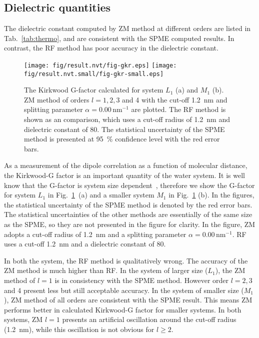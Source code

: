 \documentclass[aip,jcp,a4paper,preprint,unsortedaddress,onecolumn,fleqn]{revtex4-1}
\newcommand{\systemmb}{M_1}
\newcommand{\systemlb}{L_1}
\begin{document}
\subsection{Dielectric quantities}

The dielectric constant computed by ZM method at different orders are listed in Tab.~\ref{tab:thermo},
and are consistent with the SPME computed results. In contrast, the RF method has poor accuracy in
the dielectric constant.

\begin{figure}
  \centering
  \texttt{[image: fig/result.nvt/fig-gkr.eps]}
  \texttt{[image: fig/result.nvt.small/fig-gkr-small.eps]}
  \caption{The Kirkwood G-factor calculated for system $\systemlb$ (a) and $\systemmb$ (b).
    ZM method of orders $l=1,2,3$ and 4 with the cut-off 1.2~nm and splitting parameter $\alpha = 0.00\,\textrm{nm}^{-1}$ are plotted.
    The RF method is shown as an comparison, which uses a cut-off radius of 1.2~nm and dielectric constant of 80.
    The statistical uncertainty of the SPME method is presented at 95~\% confidence level with the red error bars.
  }
  \label{fig:gkr}
\end{figure}

As a measurement of the dipole correlation as a function of molecular distance, the Kirkwood-G factor
is an important quantity of the water system.
It is well know that the G-factor is system size
dependent~\cite{vanderSpoel2006origin}, therefore we show the G-factor for
system $\systemlb$ in Fig.~\ref{fig:gkr}~(a) and a smaller system $\systemmb$
in Fig.~\ref{fig:gkr} (b).  In the figures, the statistical uncertainty of
the SPME method is denoted by the red error bars. The statistical uncertainties of the
other methods are essentially of the same size as the SPME, so they are not presented in the figure for
clarity.  In the figure, ZM adopts a cut-off radius of 1.2~nm and a splitting parameter $\alpha = 0.00\,\textrm{nm}^{-1}$.
RF uses a cut-off 1.2~nm and a dielectric constant of 80.

In both the system, the RF method is qualitatively
wrong. The accuracy of the ZM method is much higher than RF.
In the system of larger size ($\systemlb$), the ZM method of $l=1$ is in consistency with the SPME method. However
order $l=2,3$ and 4  present less but still acceptable accuracy.
In the system of smaller size ($\systemmb$), ZM method of all orders are consistent with the SPME result.
This means ZM performs better in calculated Kirkwood-G factor for smaller systems.
In both systems, ZM $l=1$ presents  an artificial
oscillation around the cut-off radius (1.2~nm), while this oscillation is
not obvious for $l\geq 2$.
\end{document}
